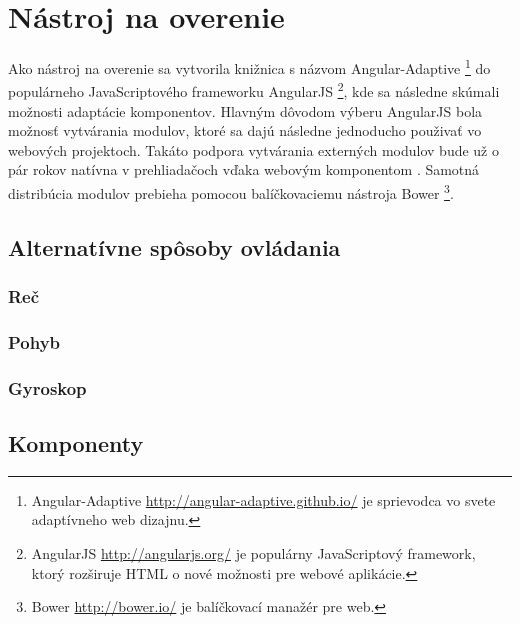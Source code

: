 \section{Nástroj na overenie} %
\label{sec:n_stroj_na_overenie}
Ako nástroj na overenie sa vytvorila knižnica s názvom Angular-Adaptive \footnote{Angular-Adaptive \url{http://angular-adaptive.github.io/} je sprievodca vo svete adaptívneho web dizajnu.} do populárneho JavaScriptového frameworku AngularJS \footnote{AngularJS \url{http://angularjs.org/} je populárny JavaScriptový framework, ktorý rozširuje HTML o nové možnosti pre webové aplikácie.}, kde sa následne skúmali možnosti adaptácie komponentov. Hlavným dôvodom výberu AngularJS bola možnosť vytvárania modulov, ktoré sa dajú následne jednoducho použivať vo webových projektoch. Takáto podpora vytvárania externých modulov bude už o pár rokov natívna v prehliadačoch vďaka webovým komponentom \cite{webcomponents}. Samotná distribúcia modulov prebieha pomocou balíčkovaciemu nástroja Bower \footnote{Bower \url{http://bower.io/} je balíčkovací manažér pre web.}.

\subsection{Alternatívne spôsoby ovládania} %
\label{sub:alternat_vne_sp_soby_ovl_dania}

\subsubsection{Reč} %
\label{ssub:re_}



\subsubsection{Pohyb} %
\label{ssub:pohyb}


\subsubsection{Gyroskop} %
\label{ssub:gyroskop}



\subsection{Komponenty} %
\label{sub:komponenty}

